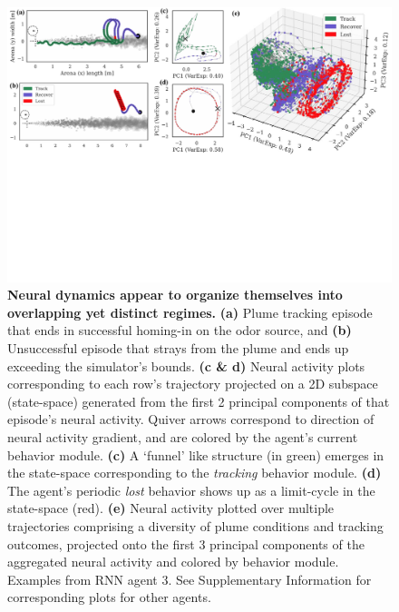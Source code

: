 \documentclass[5p,twocolumn,authoryear]{elsarticle}
\begin{document}
\begin{figure}[th!]
\begin{center}
    \includegraphics[width=1.0\linewidth]{fig_dynamics.pdf}
\caption{
\textbf{Neural dynamics appear to organize themselves into overlapping yet distinct regimes.}
\textbf{(a)} Plume tracking episode that ends in successful homing-in on the odor source, and 
\textbf{(b)} Unsuccessful episode that strays from the plume and ends up exceeding the simulator's bounds. 
\textbf{(c \& d)} Neural activity plots corresponding to each row's trajectory projected on a 2D subspace (state-space) generated from the first 2 principal components of that episode's neural activity.  
Quiver arrows correspond to direction of neural activity gradient, and are colored by the agent's current behavior module.
\textbf{(c)} A `funnel' like structure (in green) emerges in the state-space corresponding to the \textit{tracking} behavior module. 
\textbf{(d)} The agent's periodic \textit{lost} behavior shows up as a limit-cycle in the state-space (red). 
\textbf{(e)} Neural activity plotted over multiple trajectories comprising a diversity of plume conditions and tracking outcomes, projected onto the first 3 principal components of the aggregated neural activity and colored by behavior module.
Examples from RNN agent 3.
See Supplementary Information for corresponding plots for other agents.
}
\label{fig_dynamics}
\end{center}
\end{figure}


\end{document}
